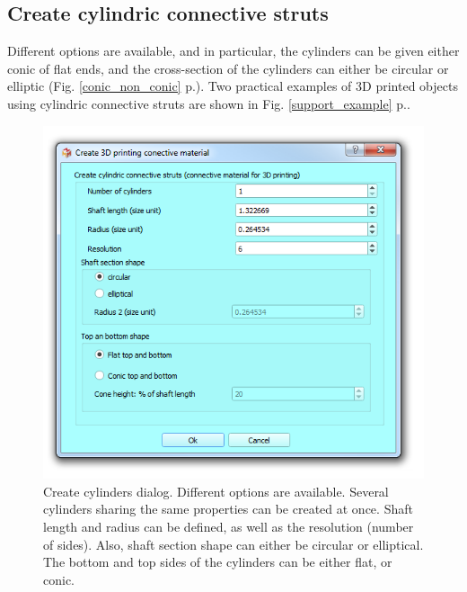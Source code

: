 \subsection{Create cylindric connective struts}
Different options are available, and in particular, the cylinders can be given either conic of flat ends, and the cross-section of the cylinders can either be circular or elliptic (Fig. \ref{conic_non_conic} p.\pageref{conic_non_conic}). 
Two practical examples of 3D printed objects using cylindric connective struts are shown in Fig. \ref{support_example} p.\pageref{support_example}.
\begin{figure}
  \centering
  \includegraphics[scale=0.5]{images/09/create_3D_printing_support_surfaces/cylinders_dialog.png} 
	\caption{Create cylinders dialog. Different options are available. Several cylinders sharing the same properties can be created at once. Shaft length and radius can be defined, as well as the resolution (number of sides). Also, shaft section shape can either be circular or elliptical. The bottom and top sides of the cylinders can be either flat, or conic.}
 \label{cylinders_dialog}
\end{figure}

